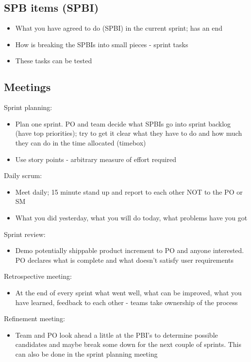 \documentclass{article}[18pt]
\begin{document}
\subsection{SPB items (SPBI)}
\begin{itemize}
	\item What you have agreed to do (SPBI) in the current sprint; has an end
	\item How is breaking the SPBIs into small pieces - sprint tasks
	\item These tasks can be tested
\end{itemize}
\subsection{Meetings}
Sprint planning:
\begin{itemize}
	\item Plan one sprint. PO and team decide what SPBIs go into sprint backlog (have top priorities); try to get it clear what they have to do and how much they can do in the time allocated (timebox)
	\item Use story points - arbitrary measure of effort required
\end{itemize}
Daily scrum:
\begin{itemize}
	\item Meet daily; 15 minute stand up and report to each other NOT to the PO or SM
	\item What you did yesterday, what you will do today, what problems have you got
\end{itemize}
Sprint review:
\begin{itemize}
	\item Demo potentially shippable product increment to PO and anyone interested. PO declares what is complete and what doesn't satisfy user requirements
\end{itemize}
Retrospective meeting:
\begin{itemize}
	\item At the end of every sprint what went well, what can be improved, what you have learned, feedback to each other - teams take ownership of the process
\end{itemize}
Refinement meeting:
\begin{itemize}
	\item Team and PO look ahead a little at the PBI's to determine possible candidates and maybe break some down for the next couple of sprints. This can also be done in the sprint planning meeting
\end{itemize}
\end{document}
